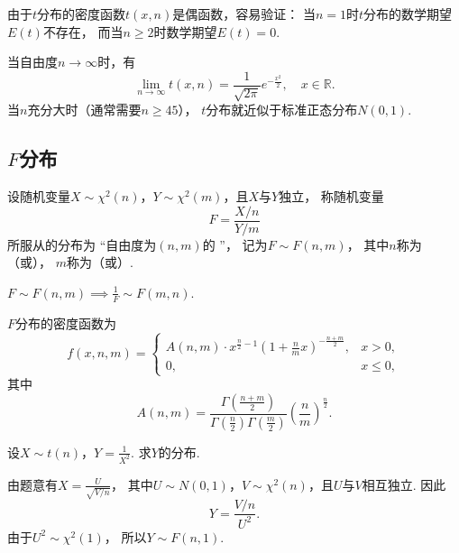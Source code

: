 由于\(t\)分布的密度函数\(t(x,n)\)是偶函数，容易验证：
当\(n=1\)时\(t\)分布的数学期望\(E(t)\)不存在，
而当\(n \geq 2\)时数学期望\(E(t)=0\).

当自由度\(n\to\infty\)时，有\begin{equation*}
	\lim_{n\to\infty} t(x,n) = \frac{1}{\sqrt{2\pi}} e^{-\frac{x^2}{2}},
	\quad x \in \mathbb{R}.
\end{equation*}
当\(n\)充分大时（通常需要\(n \geq 45\)），
\(t\)分布就近似于标准正态分布\(N(0,1)\).

\subsection{\texorpdfstring{\(F\)}{F}分布}
\begin{definition}
设随机变量\(X \sim \chi^2(n)\)，\(Y \sim \chi^2(m)\)，且\(X\)与\(Y\)独立，
称随机变量\begin{equation}
	F=\frac{X/n}{Y/m}
\end{equation}
所服从的分布为
“自由度为\((n,m)\)的 ”，
记为\(F \sim F(n,m)\)，
其中\(n\)称为（或），
\(m\)称为（或）.
\end{definition}

\begin{proposition}
\(F \sim F(n,m) \implies \frac{1}{F} \sim F(m,n)\).
\end{proposition}

\begin{theorem}
\(F\)分布的密度函数为\begin{equation}
	f(x,n,m) = \left\{ \begin{array}{cl}
		A(n,m) \cdot x^{\frac{n}{2}-1}
		\left(1+\frac{n}{m}x\right)^{-\frac{n+m}{2}},
		& x > 0, \\
		0, & x \leq 0,
	\end{array} \right.
\end{equation}
其中\begin{equation*}
	A(n,m)=\frac{
		\Gamma\left(\frac{n+m}{2}\right)
	}{
		\Gamma\left(\frac{n}{2}\right) \Gamma\left(\frac{m}{2}\right)
	}
	\left(\frac{n}{m}\right)^{\frac{n}{2}}.
\end{equation*}
\end{theorem}

\begin{example}
设\(X \sim t(n)\)，\(Y=\frac{1}{X^2}\).
求\(Y\)的分布.
\begin{solution}
由题意有\(X = \frac{U}{\sqrt{V/n}}\)，
其中\(U \sim N(0,1)\)，\(V \sim \chi^2(n)\)，且\(U\)与\(V\)相互独立.
因此\begin{equation*}
	Y = \frac{V/n}{U^2}.
\end{equation*}
由于\(U^2 \sim \chi^2(1)\)，
所以\(Y \sim F(n,1)\).
\end{solution}
\end{example}
